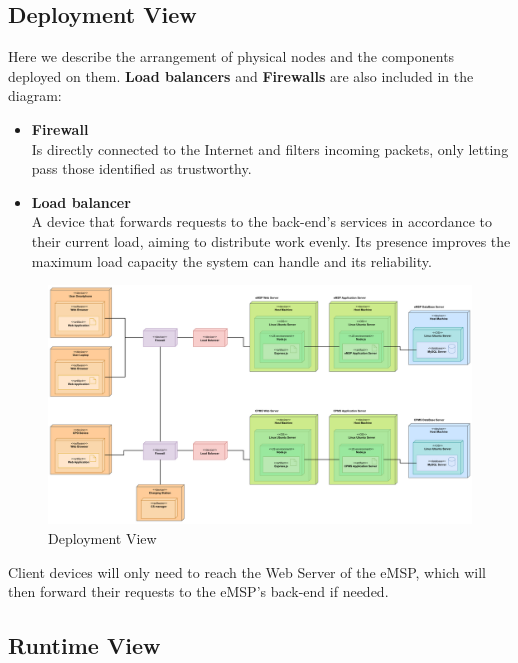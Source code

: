 \documentclass[11pt]{article}
\begin{document}
\newpage

\subsection{Deployment View}

Here we describe the arrangement of physical nodes and the components deployed on them. \textbf{Load balancers} and \textbf{Firewalls} are also included in the diagram:
\begin{itemize}
    \item \textbf{Firewall} \\
        Is directly connected to the Internet and filters incoming packets, only letting pass those identified as trustworthy.
    \item \textbf{Load balancer} \\
        A device that forwards requests to the back-end's services in accordance to their current load, aiming to distribute work evenly. Its presence improves the maximum load capacity the system can handle and its reliability. 
\end{itemize}

\begin{figure}[!ht]
    \centering
    \includegraphics[page={1}, trim=0cm 0cm 0cm 0cm, width=\linewidth, clip]{DeploymentView.pdf}
    \caption{Deployment View}
\end{figure}
    
Client devices will only need to reach the Web Server of the eMSP, which will then forward their requests to the eMSP's back-end if needed.

\newpage

\subsection{Runtime View}
\end{document}
